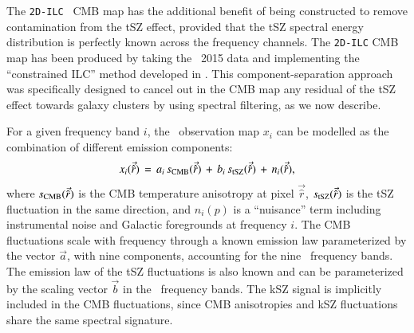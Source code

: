 \documentclass[traditabstract, longauth]{aa}
\newcommand{\1}{\'\i }
\begin{document}
The {\tt 2D-ILC} \Planck\ CMB map has the additional benefit of
being constructed to remove contamination from the tSZ effect,
provided that the
tSZ spectral energy distribution is perfectly known across the frequency
channels. The {\tt 2D-ILC} CMB map has been produced by taking the
\Planck\ 2015 data and implementing the ``constrained ILC'' method developed in
\citet{2011MNRAS.410.2481R}. This component-separation approach was specifically
designed to cancel out in the CMB map any residual of the tSZ effect towards
galaxy clusters by using spectral filtering, as we now describe.

For a given frequency band $i$, the \Planck\ observation map $x_i$ can be
modelled as the combination of different emission components:
\begin{eqnarray}
  x_i(\vec{\hat{r}})\, =\, a_i\, s_{\rm CMB} (\vec{\hat{r}})\,
  +\, b_i\, s_{\rm tSZ} (\vec{\hat{r}})\, +\,
  n_i(\vec{\hat{r}}),
\end{eqnarray}
where $s_{\rm CMB} (\vec{\hat{r}})$ is the CMB temperature anisotropy
at pixel $\vec{\hat{r}}$, $s_{\rm tSZ} (\vec{\hat{r}})$ is the
tSZ fluctuation in the same direction, and $n_i(p)$ is a ``nuisance'' term
including instrumental noise and Galactic foregrounds at frequency $i$. The CMB
fluctuations scale with frequency through a known emission law parameterized by
the vector $\vec{a}$, with nine components, accounting for the nine
\Planck\ frequency bands. The emission law of the tSZ fluctuations is also known
and can be parameterized by the scaling vector $\vec{b}$ in the \Planck\
frequency bands. The kSZ signal is implicitly included in the CMB fluctuations,
since CMB anisotropies and kSZ fluctuations share the same spectral
signature.
\end{document}
